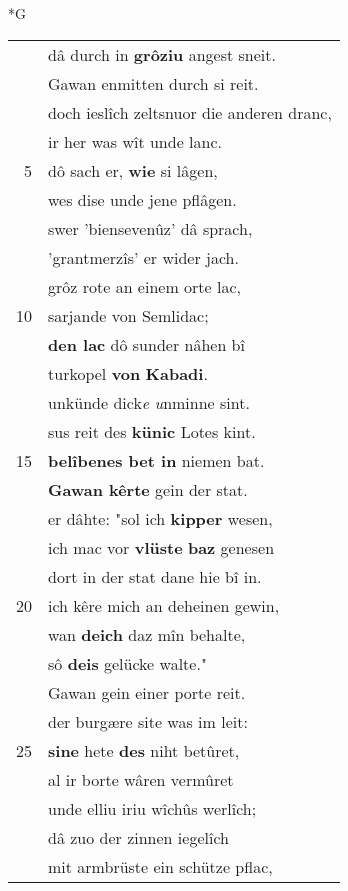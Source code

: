 \documentclass[8pt,a4paper,notitlepage]{article}
\begin{document}
\begin{table}[ht]
\begin{minipage}[t]{0.5\linewidth}
\small
\begin{center}*G
\end{center}
\begin{tabular}{rl}
 & dâ durch in \textbf{grôziu} angest sneit.\\ 
 & Gawan enmitten durch si reit.\\ 
 & doch ieslîch zeltsnuor die anderen dranc,\\ 
 & ir her was wît unde lanc.\\ 
5 & dô sach er, \textbf{wie} si lâgen,\\ 
 & wes dise unde jene pflâgen.\\ 
 & swer 'biensevenûz' dâ sprach,\\ 
 & 'grantmerzîs' er wider jach.\\ 
 & grôz rote an einem orte lac,\\ 
10 & sarjande von Semlidac;\\ 
 & \textbf{den lac} dô sunder nâhen bî\\ 
 & turkopel \textbf{von} \textbf{Kabadi}.\\ 
 & unkünde dick\textit{e} \textit{u}nminne sint.\\ 
 & sus reit des \textbf{künic} Lotes kint.\\ 
15 & \textbf{belîbenes bet in} niemen bat.\\ 
 & \textbf{Gawan kêrte} gein der stat.\\ 
 & er dâhte: "sol ich \textbf{kipper} wesen,\\ 
 & ich mac vor \textbf{vlüste} \textbf{baz} genesen\\ 
 & dort in der stat dane hie bî in.\\ 
20 & ich kêre mich an deheinen gewin,\\ 
 & wan \textbf{deich} daz mîn behalte,\\ 
 & sô \textbf{deis} gelücke walte."\\ 
 & Gawan gein einer porte reit.\\ 
 & der burgære site was im leit:\\ 
25 & \textbf{si}\textbf{ne} hete \textbf{des} niht betûret,\\ 
 & al ir borte wâren vermûret\\ 
 & unde elliu iriu wîchûs werlîch;\\ 
 & dâ zuo der zinnen iegelîch\\ 
 & mit armbrüste ein schütze pflac,\\ 

\end{tabular}
\end{minipage}
\end{table}
\end{document}
